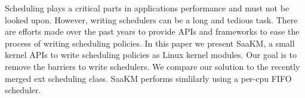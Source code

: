 Scheduling plays a critical parts in applications performance and must not be looked upon. However, writing schedulers can be a long and tedious task. There are efforts made over the past years to provide APIs and frameworks to ease the process of writing scheduling policies. In this paper we present SaaKM, a small kernel APIs to write scheduling policies as Linux kernel modules. Our goal is to remove the barriers to write schedulers. We compare our solution to the recently merged ext scheduling class. SaaKM performs simlilarly using a per-cpu FIFO scheduler.